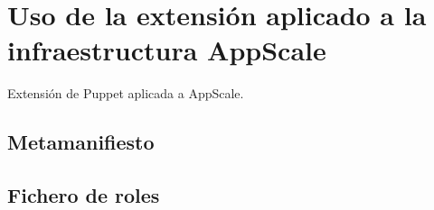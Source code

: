 \chapter{Uso de la extensión aplicado a la infraestructura AppScale}
\label{cap:appscale}

Extensión de Puppet aplicada a AppScale.


\section{Metamanifiesto}
\section{Fichero de roles}
